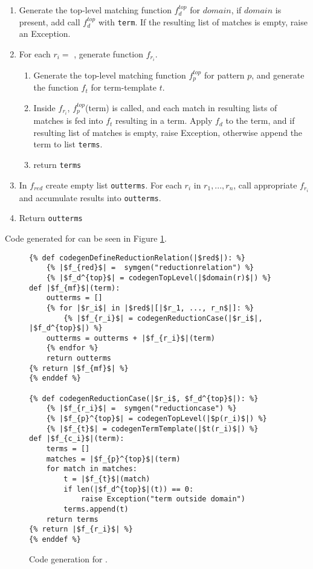 \begin{enumerate}
\item Generate the top-level matching function $f_d^{top}$ for $domain$, if $domain$ is present, add call $f_d^{top}$ with \texttt{term}. If the resulting list of matches is empty, raise an Exception.
\item For each $r_i= $ \ReductionCase, generate function $f_{r_i}$.
	\begin{enumerate}
	\item Generate the top-level matching function $f_p^{top}$ for pattern $p$, and generate the function $f_t$ for term-template $t$.
	\item Inside $f_{r_i}$, $f_p^{top}$(term) is called, and each match in resulting lists of matches is fed into $f_t$ resulting in a term. Apply $f_d$ to the term, and if resulting list of matches is empty, raise Exception, otherwise append the term to list \texttt{terms}.
	\item return \texttt{terms}
	\end{enumerate}
\item In $f_{red}$ create empty list \texttt{outterms}. For each $r_i$ in $r_1, ..., r_n$, call appropriate $f_{r_i}$ and accumulate results into \texttt{outterms}.
\item Return \texttt{outterms}
\end{enumerate}

Code generated for \DefineReductionRelationNoArgs \space can be seen in Figure \ref{codegen-define-red}.

\begin{figure}
\begin{verbatim}
{% def codegenDefineReductionRelation(|$red$|): %}
	{% |$f_{red}$| =  symgen("reductionrelation") %}
	{% |$f_d^{top}$| = codegenTopLevel(|$domain(r)$|) %}
def |$f_{mf}$|(term):
	outterms = []
	{% for |$r_i$| in |$red$|[|$r_1, ..., r_n$|]: %}
		{% |$f_{r_i}$| = codegenReductionCase(|$r_i$|, |$f_d^{top}$|) %}
	outterms = outterms + |$f_{r_i}$|(term)
	{% endfor %}
	return outterms
{% return |$f_{mf}$| %}
{% enddef %}

{% def codegenReductionCase(|$r_i$, $f_d^{top}$|): %}
	{% |$f_{r_i}$| =  symgen("reductioncase") %}
	{% |$f_{p}^{top}$| = codegenTopLevel(|$p(r_i)$|) %}
	{% |$f_{t}$| = codegenTermTemplate(|$t(r_i)$|) %}
def |$f_{c_i}$|(term):
	terms = []
	matches = |$f_{p}^{top}$|(term)
	for match in matches:
		t = |$f_{t}$|(match)
		if len(|$f_d^{top}$|(t)) == 0:
			raise Exception("term outside domain")
		terms.append(t)
	return terms
{% return |$f_{r_i}$| %}
{% enddef %}
\end{verbatim}
\caption{Code generation for \DefineReductionRelationNoArgs.}
\label{codegen-define-red}
\end{figure}
